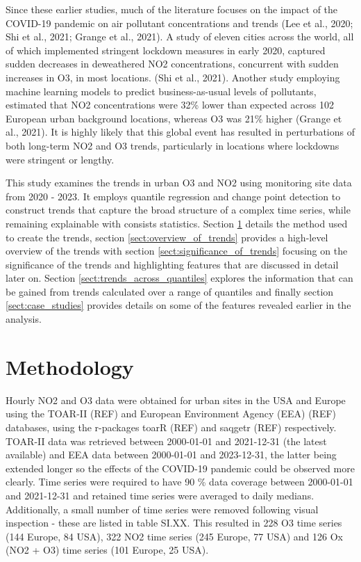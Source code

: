 \documentclass[journal abbreviation, manuscript]{copernicus}
\begin{document}
Since these earlier studies, much of the literature focuses on the impact of the COVID-19 pandemic on air pollutant concentrations and trends (Lee et al., 2020; Shi et al., 2021; Grange et al., 2021). A study of eleven cities across the world, all of which implemented stringent lockdown measures in early 2020, captured sudden decreases in deweathered NO2 concentrations, concurrent with sudden increases in O3, in most locations. (Shi et al., 2021). Another study employing machine learning models to predict business-as-usual levels of pollutants, estimated that NO2 concentrations were 32\% lower than expected across 102 European urban background locations, whereas O3 was 21\% higher (Grange et al., 2021). It is highly likely that this global event has resulted in perturbations of both long-term NO2 and O3 trends, particularly in locations where lockdowns were stringent or lengthy.

This study examines the trends in urban O3 and NO2 using monitoring site data from 2020 - 2023. It employs quantile regression and change point detection to construct trends that capture the broad structure of a complex time series, while remaining explainable with consists statistics. Section \ref{sect:method} details the method used to create the trends, section \ref{sect:overview_of_trends} provides a high-level overview of the trends with section \ref{sect:significance_of_trends} focusing on the significance of the trends and highlighting features that are discussed in detail later on. Section \ref{sect:trends_across_quantiles} explores the information that can be gained from trends calculated over a range of quantiles and finally section \ref{sect:case_studies} provides details on some of the features revealed earlier in the analysis. 


\section{Methodology} \label{sect:method}
Hourly NO2 and O3 data were obtained for urban sites in the USA and Europe using the TOAR-II (REF) and European Environment Agency (EEA) (REF) databases, using the r-packages toarR (REF) and saqgetr (REF) respectively. TOAR-II data was retrieved between 2000-01-01 and 2021-12-31 (the latest available) and EEA data between 2000-01-01 and 2023-12-31, the latter being extended longer so the effects of the COVID-19 pandemic could be observed more clearly. Time series were required to have 90 \% data coverage between 2000-01-01 and 2021-12-31 and retained time series were averaged to daily medians. Additionally, a small number of time series were removed following visual inspection - these are listed in table SI.XX. This resulted in 228 O3 time series (144 Europe, 84 USA), 322 NO2 time series (245 Europe, 77 USA) and 126 Ox (NO2 + O3) time series (101 Europe, 25 USA).
\end{document}
